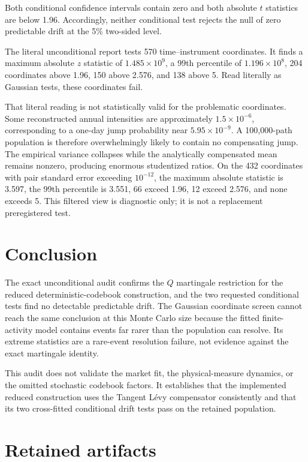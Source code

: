 \documentclass[11pt]{article}
\begin{document}
Both conditional confidence intervals contain zero and both absolute
$t$ statistics are below 1.96.  Accordingly, neither conditional test rejects
the null of zero predictable drift at the 5\% two-sided level.

The literal unconditional report tests 570 time--instrument coordinates.  It
finds a maximum absolute $z$ statistic of $1.485\times10^9$, a 99th percentile
of $1.196\times10^8$, 204 coordinates above 1.96, 150 above 2.576, and 138
above 5.  Read literally as Gaussian tests, these coordinates fail.

That literal reading is not statistically valid for the problematic
coordinates.  Some reconstructed annual intensities are approximately
$1.5\times10^{-6}$, corresponding to a one-day jump probability near
$5.95\times10^{-9}$.  A 100,000-path population is therefore overwhelmingly
likely to contain no compensating jump.  The empirical variance collapses while
the analytically compensated mean remains nonzero, producing enormous
studentized ratios.  On the 432 coordinates with pair standard error exceeding
$10^{-12}$, the maximum absolute statistic is 3.597, the 99th percentile is
3.551, 66 exceed 1.96, 12 exceed 2.576, and none exceeds 5.  This filtered view
is diagnostic only; it is not a replacement preregistered test.

\section{Conclusion}

The exact unconditional audit confirms the $Q$ martingale restriction for the
reduced deterministic-codebook construction, and the two requested conditional
tests find no detectable predictable drift.  The Gaussian coordinate screen
cannot reach the same conclusion at this Monte Carlo size because the fitted
finite-activity model contains events far rarer than the population can
resolve.  Its extreme statistics are a rare-event resolution failure, not
evidence against the exact martingale identity.

This audit does not validate the market fit, the physical-measure dynamics, or
the omitted stochastic codebook factors.  It establishes that the implemented
reduced construction uses the Tangent L\'evy compensator consistently and that
its two cross-fitted conditional drift tests pass on the retained population.

\section{Retained artifacts}
\end{document}
